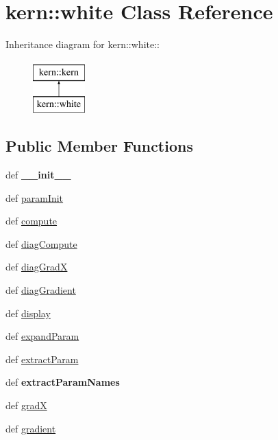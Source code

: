 \hypertarget{classkern_1_1white}{
\section{kern::white Class Reference}
\label{classkern_1_1white}
}
Inheritance diagram for kern::white::\begin{figure}[H]
\begin{center}
\leavevmode
\includegraphics[height=2cm]{classkern_1_1white}
\end{center}
\end{figure}
\subsection*{Public Member Functions}
\begin{CompactItemize}
\item 
\hypertarget{classkern_1_1white_9a077edd7efcf16bee19b972a63965da}{
def \textbf{\_\-\_\-init\_\-\_\-}}
\label{classkern_1_1white_9a077edd7efcf16bee19b972a63965da}

\item 
def \hyperlink{classkern_1_1white_c9ce06fb072cdb4e1d769a8a926cc6fc}{paramInit}
\item 
def \hyperlink{classkern_1_1white_57249e12e16d1cda32db34818fc083ff}{compute}
\item 
def \hyperlink{classkern_1_1white_952f70cef3c05231022b3221d10d23ed}{diagCompute}
\item 
def \hyperlink{classkern_1_1white_1a7249a7d74e3282f581a4ac80be35ce}{diagGradX}
\item 
def \hyperlink{classkern_1_1white_3a2f74e8f49816b15e75b067e312f7dc}{diagGradient}
\item 
def \hyperlink{classkern_1_1white_ec5a23f33a26211bdfa4c8c5d0e022fe}{display}
\item 
def \hyperlink{classkern_1_1white_da7b491984621299ab25fef437d4b1b2}{expandParam}
\item 
def \hyperlink{classkern_1_1white_9b1bed2b896a0f9f15e3d568c2f2c54a}{extractParam}
\item 
\hypertarget{classkern_1_1white_7e5528f089942ba4b2899ae5bc2aff37}{
def \textbf{extractParamNames}}
\label{classkern_1_1white_7e5528f089942ba4b2899ae5bc2aff37}

\item 
def \hyperlink{classkern_1_1white_621f9c599dbfca7a038e9d5da8da8bc8}{gradX}
\item 
def \hyperlink{classkern_1_1white_e9f2b22e87fdf88c17187a3eb31f76a6}{gradient}
\end{CompactItemize}

